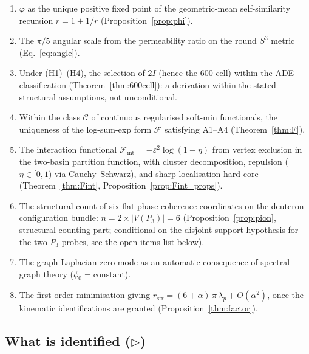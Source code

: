 \documentclass[12pt]{article}
\newcommand{\Fcal}{\mathcal{F}}
\newcommand{\Fint}{\Fcal_{\mathrm{int}}}
\newcommand{\phig}{\varphi}
\newcommand{\lbar}{\bar{\lambda}}
\begin{document}
\begin{enumerate}
    \item $\phig$ as the unique positive fixed point of the geometric-mean self-similarity recursion $r = 1 + 1/r$ (Proposition~\ref{prop:phi}).
    \item The $\pi/5$ angular scale from the permeability ratio on the round $S^3$ metric (Eq.~\ref{eq:angle}).
    \item Under (H1)--(H4), the selection of $2I$ (hence the 600-cell) within the ADE classification (Theorem~\ref{thm:600cell}): a derivation within the stated structural assumptions, not unconditional.
    \item Within the class $\mathcal{C}$ of continuous regularised soft-min functionals, the uniqueness of the log-sum-exp form $\Fcal$ satisfying A1--A4 (Theorem~\ref{thm:F}).
    \item The interaction functional $\Fint = -\varepsilon^2\log(1-\eta)$ from vertex exclusion in the two-basin partition function, with cluster decomposition, repulsion ($\eta \in [0,1)$ via Cauchy--Schwarz), and sharp-localisation hard core (Theorem~\ref{thm:Fint}, Proposition~\ref{prop:Fint_props}).
    \item The structural count of six flat phase-coherence coordinates on the deuteron configuration bundle: $n = 2 \times |V(P_3)| = 6$ (Proposition~\ref{prop:pion}, structural counting part; conditional on the disjoint-support hypothesis for the two $P_3$ probes, see the open-items list below).
    \item The graph-Laplacian zero mode as an automatic consequence of spectral graph theory ($\phi_0 = \text{constant}$).
    \item The first-order minimisation giving $r_{\mathrm{str}} = (6 + \alpha)\,\pi\,\lbar_p + O(\alpha^2)$, once the kinematic identifications are granted (Proposition~\ref{thm:factor}).
\end{enumerate}

\subsection{What is identified ($\triangleright$)}
\end{document}
